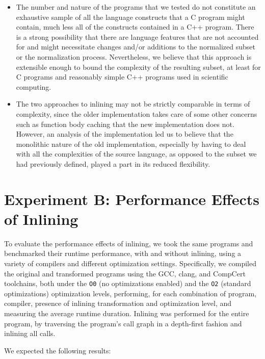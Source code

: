 \begin{itemize}
    \item The number and nature of the programs that we tested do not constitute an exhaustive sample of all the language constructs that a C program might contain, much less all of the constructs contained in a C++ program. There is a strong possibility that there are language features that are not accounted for and might necessitate changes and/or additions to the normalized subset or the normalization process. Nevertheless, we believe that this approach is extensible enough to bound the complexity of the resulting subset, at least for C programs and reasonably simple C++ programs used in scientific computing.
    \item The two approaches to inlining may not be strictly comparable in terms of complexity, since the older implementation takes care of some other concerns such as function body caching that the new implementation does not. However, an analysis of the implementation led us to believe that the monolithic nature of the old implementation, especially by having to deal with all the complexities of the source language, as opposed to the subset we had previously defined, played a part in its reduced flexibility.
\end{itemize}

\section{Experiment B: Performance Effects of Inlining}

To evaluate the performance effects of inlining, we took the same programs and benchmarked their runtime performance, with and without inlining, using a variety of compilers and different optimization settings. Specifically, we compiled the original and transformed programs using the GCC, clang, and CompCert toolchains, both under the \texttt{O0} (no optimizations enabled) and the \texttt{O2} (standard optimizations) optimization levels, performing, for each combination of program, compiler, presence of inlining transformation and optimization level, and measuring the average runtime duration. Inlining was performed for the entire program, by traversing the program's call graph in a depth-first fashion and inlining all calls.

We expected the following results:

